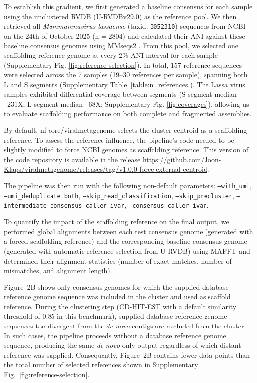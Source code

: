 To establish this gradient, we first generated a baseline consensus for each sample using the unclustered RVDB (U-RVDBv29.0) as the reference pool. We then retrieved all \textit{Mammarenavirus lassaense} (taxid: \texttt{3052310}) sequences from NCBI on the 24th of October 2025 (n = 2804) and calculated their ANI against these baseline consensus genomes using MMseqs2 \citep{Steinegger2017-ci}.  From this pool, we selected one scaffolding reference genome at every 2\% ANI interval for each sample (Supplementary Fig. \ref{fig:reference-selection}).  In total, 157 reference sequences were selected across the 7 samples (19--30 references per sample), spanning both L and S segments  (Supplementary Table~\ref{table:n_references}). The Lassa virus samples exhibited differential coverage between segments (S segment median ~231X, L segment median ~68X; Supplementary Fig. \ref{fig:coverages}), allowing us to evaluate scaffolding performance on both complete and fragmented assemblies.

By default, nf-core/viralmetagenome selects the cluster centroid as a scaffolding reference. To assess the reference influence, the pipeline’s code needed to be slightly modified to force NCBI genomes as scaffolding reference. This version of the code repository is available in the release \url{https://github.com/Joon-Klaps/viralmetagenome/releases/tag/v1.0.0-force-external-centroid}.

The pipeline was then run with the following non-default parameters: \texttt{--with\_umi}, \texttt{--umi\_deduplicate both}, \texttt{--skip\_read\_classification}, \texttt{--skip\_precluster}, \texttt{--intermediate\_consensus\_caller ivar}, \texttt{--consensus\_caller ivar}.

To quantify the impact of the scaffolding reference on the final output, we performed global alignments between each test consensus genome (generated with a forced scaffolding reference) and the corresponding baseline consensus genome (generated with automatic reference selection from U-RVDB) using MAFFT \citep{Katoh2002-ox} and determined their alignment statistics (number of exact matches, number of mismatches, and alignment length).

Figure~2B shows only consensus genomes for which the supplied database reference genome sequence was included in the cluster and used as scaffold reference. During the clustering step (CD-HIT-EST with a default similarity threshold of 0.85 in this benchmark), supplied database reference genome sequences too divergent from the \textit{de novo} contigs are excluded from the cluster. In such cases, the pipeline proceeds without a database reference genome sequence, producing the same \textit{de novo}-only output regardless of which distant reference was supplied. Consequently, Figure~2B contains fewer data points than the total number of selected references shown in Supplementary Fig.~\ref{fig:reference-selection}.

